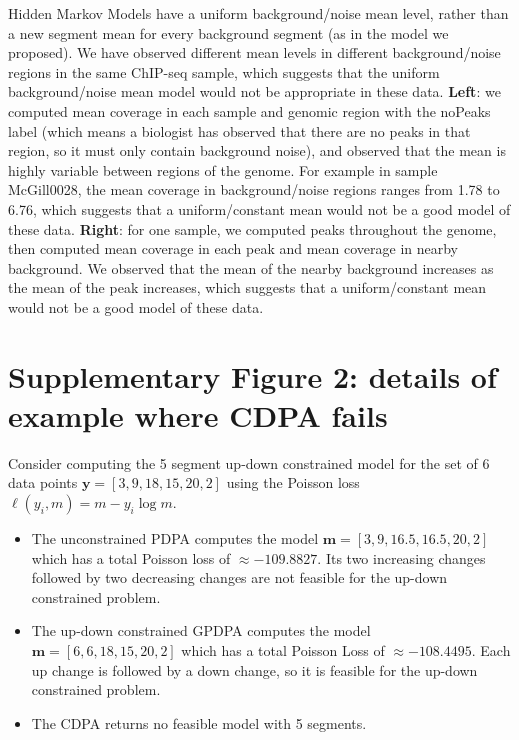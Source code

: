 \documentclass{article}
\begin{document}
Hidden Markov Models have a uniform background/noise mean
level, rather than a new segment mean for every background segment (as
in the model we proposed). We have observed different mean levels in
different background/noise regions in the same ChIP-seq sample, which
suggests that the uniform background/noise mean model would not be
appropriate in these data.  \textbf{Left}: we computed mean coverage
in each sample and genomic region with the noPeaks label (which means
a biologist has observed that there are no peaks in that region, so it
must only contain background noise), and observed that the mean is
highly variable between regions of the genome. For example in sample
McGill0028, the mean coverage in background/noise regions ranges from
1.78 to 6.76, which suggests that a uniform/constant mean would not be
a good model of these data. \textbf{Right}: for one sample, we
computed peaks throughout the genome, then computed mean coverage in
each peak and mean coverage in nearby background. We observed that the
mean of the nearby background increases as the mean of the peak
increases, which suggests that a uniform/constant mean would not be a
good model of these data.

\section*{Supplementary Figure 2: details of example where CDPA fails}

Consider computing the 5 segment up-down constrained model for the set
of 6 data points $\mathbf y = [3, 9, 18, 15, 20, 2]$ using the Poisson loss
$\ell(y_i, m)=m-y_i\log m$. 
\begin{itemize}
\item The unconstrained PDPA computes the model $\mathbf m = [3, 9, 16.5, 16.5, 20,
  2]$ which has a total Poisson loss of $\approx -109.8827$. Its two increasing
  changes followed by two decreasing changes are not feasible for the
  up-down constrained problem.
\item The up-down constrained GPDPA computes the model $\mathbf m = [6, 6, 18, 15,
  20, 2]$ which has a total Poisson Loss of $\approx -108.4495$. Each
  up change is followed by a down change, so it is feasible for the
  up-down constrained problem.
\item The CDPA returns no feasible model with 5 segments.
\end{itemize}
\end{document}
